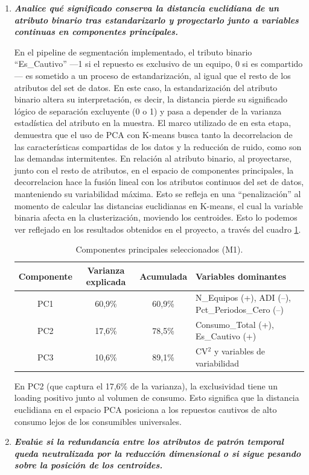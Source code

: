 \documentclass[10pt,a4paper]{article}
\begin{document}
\begin{enumerate}
    \item \textbf{\textit{Analice qué significado conserva la distancia euclidiana de un atributo binario tras estandarizarlo y proyectarlo junto a variables continuas en componentes principales.}}

En el pipeline de segmentación implementado, el tributo binario ``Es\_Cautivo'' —1 si el repuesto es exclusivo de un equipo, 0 si es compartido— es sometido a un proceso de estandarización, al igual que el resto de los atributos del set de datos. En este caso, la estandarización del atributo binario altera su interpretación, es decir, la distancia pierde su significado lógico de separación excluyente (0 o 1) y pasa a depender de la varianza estadística del atributo en la muestra. El marco utilizado de \cite{jackson2022} en esta etapa, demuestra que el uso de PCA con K-means busca tanto la decorrelacion de las características compartidas de los datos y la reducción de ruido, como son las demandas intermitentes. En relación al atributo binario, al proyectarse, junto con el resto de atributos, en el espacio de componentes principales, la decorrelacion hace la fusión lineal con los atributos continuos del set de datos, manteniendo su variabilidad máxima. Esto se refleja en una “penalización” al momento de calcular las distancias euclidianas en K-means, el cual la variable binaria afecta en la clusterización, moviendo los centroides. Esto lo podemos ver reflejado en los resultados obtenidos en el proyecto, a través del cuadro \ref{tab:pca_componentes1}. 

\begin{table}[H]
\centering
\caption{Componentes principales seleccionados (M1).}
\label{tab:pca_componentes1}
\begin{tabularx}{\textwidth}{c c c X}
\hline
\textbf{Componente} & \textbf{Varianza explicada} & \textbf{Acumulada} &
\textbf{Variables dominantes} \\
\hline
PC1 & 60,9\% & 60,9\% & N\_Equipos (+), ADI (--), Pct\_Periodos\_Cero (--) \\
PC2 & 17,6\% & 78,5\% & Consumo\_Total (+), Es\_Cautivo (+) \\
PC3 & 10,6\% & 89,1\% & CV$^2$ y variables de variabilidad \\
\hline
\end{tabularx}
\end{table}

En PC2 (que captura el 17,6\% de la varianza), la exclusividad tiene un loading positivo junto al volumen de consumo. Esto significa que la distancia euclidiana en el espacio PCA posiciona a los repuestos cautivos de alto consumo lejos de los consumibles universales.
\\[0.25cm]
    \item \textbf{\textit{Evalúe si la redundancia entre los atributos de patrón temporal queda neutralizada por la reducción dimensional o si sigue pesando sobre la posición de los centroides.}}


\end{enumerate}
\end{document}
